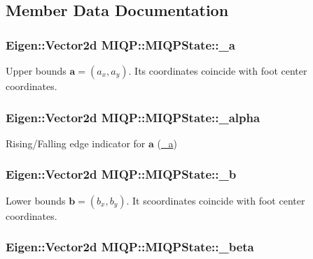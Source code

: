 \subsection{\-Member \-Data \-Documentation}
\hypertarget{classMIQP_1_1MIQPState_a6717fedc0f49df4f60ecb6b97955da1e}{
\subsubsection[{\-\_\-a}]{\setlength{\rightskip}{0pt plus 5cm}\-Eigen\-::\-Vector2d {\bf \-M\-I\-Q\-P\-::\-M\-I\-Q\-P\-State\-::\-\_\-a}}}\label{classMIQP_1_1MIQPState_a6717fedc0f49df4f60ecb6b97955da1e}
\-Upper bounds $\mathbf{a} = (a_x, a_y)$. \-Its coordinates coincide with foot center coordinates. \hypertarget{classMIQP_1_1MIQPState_a584ef13e157d3a34333d4f990363abc7}{
\subsubsection[{\-\_\-alpha}]{\setlength{\rightskip}{0pt plus 5cm}\-Eigen\-::\-Vector2d {\bf \-M\-I\-Q\-P\-::\-M\-I\-Q\-P\-State\-::\-\_\-alpha}}}\label{classMIQP_1_1MIQPState_a584ef13e157d3a34333d4f990363abc7}
\-Rising/\-Falling edge indicator for $\mathbf{a}$ (\hyperlink{classMIQP_1_1MIQPState_a6717fedc0f49df4f60ecb6b97955da1e}{\-\_\-a}) \hypertarget{classMIQP_1_1MIQPState_aafa5bce9860b191257cb0166c217e9a3}{
\subsubsection[{\-\_\-b}]{\setlength{\rightskip}{0pt plus 5cm}\-Eigen\-::\-Vector2d {\bf \-M\-I\-Q\-P\-::\-M\-I\-Q\-P\-State\-::\-\_\-b}}}\label{classMIQP_1_1MIQPState_aafa5bce9860b191257cb0166c217e9a3}
\-Lower bounds $\mathbf{b} = (b_x, b_y)$. \-It scoordinates coincide with foot center coordinates. \hypertarget{classMIQP_1_1MIQPState_ad5f8f3e9a18a29810b4347540ddf7c82}{
\subsubsection[{\-\_\-beta}]{\setlength{\rightskip}{0pt plus 5cm}\-Eigen\-::\-Vector2d {\bf \-M\-I\-Q\-P\-::\-M\-I\-Q\-P\-State\-::\-\_\-beta}}}\label{classMIQP_1_1MIQPState_ad5f8f3e9a18a29810b4347540ddf7c82}
